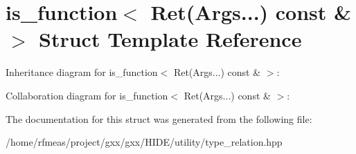 \hypertarget{structis__function_3_01Ret_07Args_8_8_8_08_01const_01_6_01_4}{}\section{is\+\_\+function$<$ Ret(Args...) const \& $>$ Struct Template Reference}
\label{structis__function_3_01Ret_07Args_8_8_8_08_01const_01_6_01_4}


Inheritance diagram for is\+\_\+function$<$ Ret(Args...) const \& $>$\+:


Collaboration diagram for is\+\_\+function$<$ Ret(Args...) const \& $>$\+:


The documentation for this struct was generated from the following file\+:\begin{DoxyCompactItemize}
\item 
/home/rfmeas/project/gxx/gxx/\+H\+I\+D\+E/utility/type\+\_\+relation.\+hpp\end{DoxyCompactItemize}
